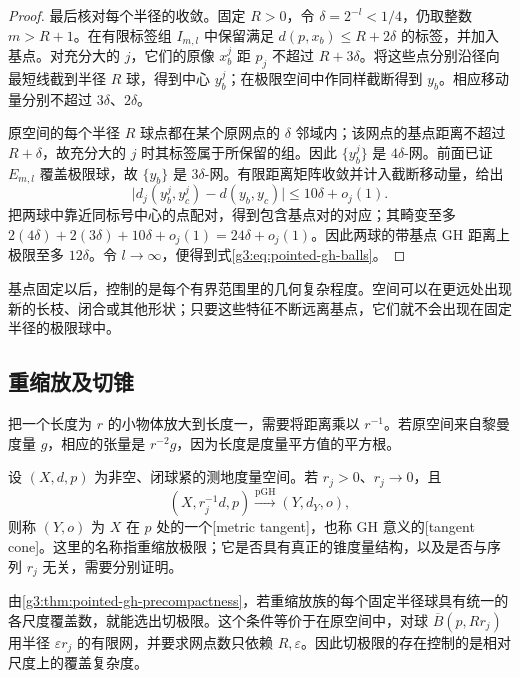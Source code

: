 \begin{proof}
	最后核对每个半径的收敛。固定 \(R>0\)，令 \(\delta=2^{-l}<1/4\)，仍取整数 \(m>R+1\)。在有限标签组 \(I_{m,l}\) 中保留满足 \(d(p,x_b)\le R+2\delta\) 的标签，并加入基点。对充分大的 \(j\)，它们的原像 \(x_b^j\) 距 \(p_j\) 不超过 \(R+3\delta\)。将这些点分别沿径向最短线截到半径 \(R\) 球，得到中心 \(y_b^j\)；在极限空间中作同样截断得到 \(y_b\)。相应移动量分别不超过 \(3\delta\)、\(2\delta\)。

	原空间的每个半径 \(R\) 球点都在某个原网点的 \(\delta\) 邻域内；该网点的基点距离不超过 \(R+\delta\)，故充分大的 \(j\) 时其标签属于所保留的组。因此 \(\{y_b^j\}\) 是 \(4\delta\)-网。前面已证 \(E_{m,l}\) 覆盖极限球，故 \(\{y_b\}\) 是 \(3\delta\)-网。有限距离矩阵收敛并计入截断移动量，给出
	\[
		\bigl|d_j(y_b^j,y_c^j)-d(y_b,y_c)\bigr|
		\le10\delta+o_j(1).
	\]
	把两球中靠近同标号中心的点配对，得到包含基点对的对应；其畸变至多
	\(2(4\delta)+2(3\delta)+10\delta+o_j(1)=24\delta+o_j(1)\)。因此两球的带基点 GH 距离上极限至多 \(12\delta\)。令 \(l\to\infty\)，便得到式\eqref{g3:eq:pointed-gh-balls}。
\end{proof}

基点固定以后，控制的是每个有界范围里的几何复杂程度。空间可以在更远处出现新的长枝、闭合或其他形状；只要这些特征不断远离基点，它们就不会出现在固定半径的极限球中。

\subsection{重缩放及切锥}
\label{g3:subsec:1004:02}
把一个长度为 \(r\) 的小物体放大到长度一，需要将距离乘以 \(r^{-1}\)。若原空间来自黎曼度量 \(g\)，相应的张量是 \(r^{-2}g\)，因为长度是度量平方值的平方根。

\begin{definition}\label{g3:def:metric-tangent-limit}
	设 \((X,d,p)\) 为非空、闭球紧的测地度量空间。若 \(r_j>0\)、\(r_j\to0\)，且
	\begin{equation}\label{g3:eq:metric-tangent-limit}
		(X,r_j^{-1}d,p)\xrightarrow{\mathrm{pGH}}(Y,d_Y,o),
	\end{equation}
	则称 \((Y,o)\) 为 \(X\) 在 \(p\) 处的一个[metric tangent]，也称 GH 意义的[tangent cone]。这里的名称指重缩放极限；它是否具有真正的锥度量结构，以及是否与序列 \(r_j\) 无关，需要分别证明。
\end{definition}

由\cref{g3:thm:pointed-gh-precompactness}，若重缩放族的每个固定半径球具有统一的各尺度覆盖数，就能选出切极限。这个条件等价于在原空间中，对球 \(\overline B(p,Rr_j)\) 用半径 \(\varepsilon r_j\) 的有限网，并要求网点数只依赖 \(R,\varepsilon\)。因此切极限的存在控制的是相对尺度上的覆盖复杂度。

